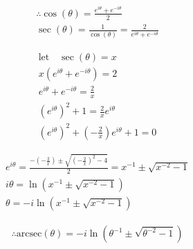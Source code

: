 \documentclass{../../style}
\begin{document}
\euler

\begin{gather*}
	\therefore \cos(\theta) = \frac{e^{i\theta} + e^{-i\theta}}{2} \\
	\sec(\theta) = \frac{1}{\cos(\theta)} = \frac{2}{e^{i\theta} + e^{-i\theta}}
\end{gather*}

\begin{gather*}
	\text{let} \quad \sec(\theta) = x \\
	x(e^{i\theta} + e^{-i\theta}) = 2 \\
	e^{i\theta} + e^{-i\theta} = \frac{2}{x} \\
	(e^{i\theta})^2 + 1 = \frac{2}{x}e^{i\theta} \\
	(e^{i\theta})^2 + (-\frac{2}{x})e^{i\theta} + 1 = 0
\end{gather*}

\begin{gather*}
	e^{i\theta} = \frac{-(-\frac{2}{x}) \pm \sqrt{(-\frac{2}{x})^2 - 4}}{2} = x^{-1} \pm \sqrt{x^{-2} - 1} \\
	i\theta = \ln(x^{-1} \pm \sqrt{x^{-2} - 1}) \\
	\theta = -i\ln(x^{-1} \pm \sqrt{x^{-2} - 1})
\end{gather*}

\begin{gather*}
	\therefore \text{arcsec}(\theta) = -i\ln(\theta^{-1} \pm \sqrt{\theta^{-2} - 1})
\end{gather*}
\end{document}
